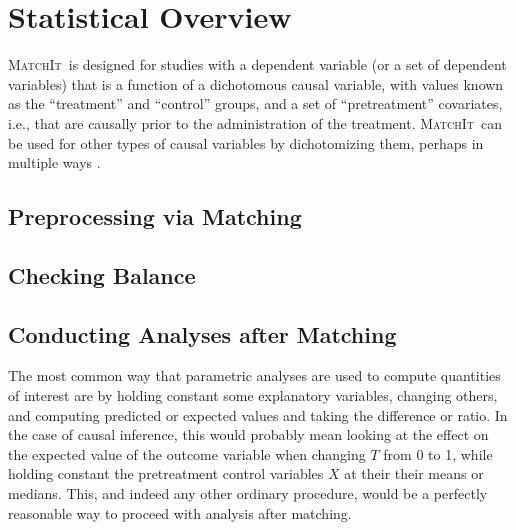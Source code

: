 \documentclass[oneside,letterpaper,titlepage]{article}
\newcommand{\MatchIt}{\textsc{MatchIt}}
\begin{document}

\section{Statistical Overview}

\MatchIt\ is designed for studies with a dependent variable (or a set
of dependent variables) that is a function of a dichotomous causal
variable, with values known as the ``treatment'' and ``control''
groups, and a set of ``pretreatment'' covariates, i.e., that are
causally prior to the administration of the treatment.  \MatchIt\ can
be used for other types of causal variables by dichotomizing them,
perhaps in multiple ways \citep[see also][]{ImaDyk04}.

\subsection{Preprocessing via Matching}

  
\subsection{Checking Balance}


\subsection{Conducting Analyses after Matching}

The most common way that parametric analyses are used to compute
quantities of interest are by holding constant some explanatory
variables, changing others, and computing predicted or expected values
and taking the difference or ratio.  In the case of causal inference,
this would probably mean looking at the effect on the expected value
of the outcome variable when changing $T$ from 0 to 1, while holding
constant the pretreatment control variables $X$ at their their means
or medians.  This, and indeed any other ordinary procedure, would be a
perfectly reasonable way to proceed with analysis after matching.
\end{document}
